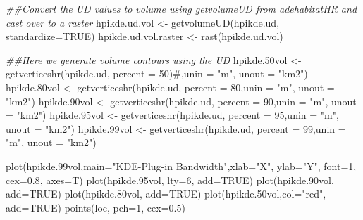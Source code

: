 \documentclass[
  letterpaper,
]{book}
\newenvironment{Shaded}{\begin{snugshade}}{\end{snugshade}}
\newcommand{\AttributeTok}[1]{\textcolor[rgb]{0.40,0.45,0.13}{#1}}
\newcommand{\CommentTok}[1]{\textcolor[rgb]{0.37,0.37,0.37}{#1}}
\newcommand{\ConstantTok}[1]{\textcolor[rgb]{0.56,0.35,0.01}{#1}}
\newcommand{\DecValTok}[1]{\textcolor[rgb]{0.68,0.00,0.00}{#1}}
\newcommand{\DocumentationTok}[1]{\textcolor[rgb]{0.37,0.37,0.37}{\textit{#1}}}
\newcommand{\FloatTok}[1]{\textcolor[rgb]{0.68,0.00,0.00}{#1}}
\newcommand{\FunctionTok}[1]{\textcolor[rgb]{0.28,0.35,0.67}{#1}}
\newcommand{\NormalTok}[1]{\textcolor[rgb]{0.00,0.23,0.31}{#1}}
\newcommand{\OtherTok}[1]{\textcolor[rgb]{0.00,0.23,0.31}{#1}}
\newcommand{\StringTok}[1]{\textcolor[rgb]{0.13,0.47,0.30}{#1}}
\begin{document}
\begin{Shaded}
\begin{Highlighting}[]
\DocumentationTok{\#\#Convert the UD values to volume using getvolumeUD from adehabitatHR and cast over to a raster}
\NormalTok{hpikde.ud.vol }\OtherTok{\textless{}{-}} \FunctionTok{getvolumeUD}\NormalTok{(hpikde.ud, }\AttributeTok{standardize=}\ConstantTok{TRUE}\NormalTok{)}
\NormalTok{hpikde.ud.vol.raster }\OtherTok{\textless{}{-}} \FunctionTok{rast}\NormalTok{(hpikde.ud.vol)}

\DocumentationTok{\#\#Here we generate volume contours using the UD}
\NormalTok{hpikde}\FloatTok{.50}\NormalTok{vol }\OtherTok{\textless{}{-}} \FunctionTok{getverticeshr}\NormalTok{(hpikde.ud, }\AttributeTok{percent =} \DecValTok{50}\NormalTok{)}\CommentTok{\#,unin = "m", unout = "km2")}
\NormalTok{hpikde}\FloatTok{.80}\NormalTok{vol }\OtherTok{\textless{}{-}} \FunctionTok{getverticeshr}\NormalTok{(hpikde.ud, }\AttributeTok{percent =} \DecValTok{80}\NormalTok{,}\AttributeTok{unin =} \StringTok{"m"}\NormalTok{, }\AttributeTok{unout =} \StringTok{"km2"}\NormalTok{)}
\NormalTok{hpikde}\FloatTok{.90}\NormalTok{vol }\OtherTok{\textless{}{-}} \FunctionTok{getverticeshr}\NormalTok{(hpikde.ud, }\AttributeTok{percent =} \DecValTok{90}\NormalTok{,}\AttributeTok{unin =} \StringTok{"m"}\NormalTok{, }\AttributeTok{unout =} \StringTok{"km2"}\NormalTok{)}
\NormalTok{hpikde}\FloatTok{.95}\NormalTok{vol }\OtherTok{\textless{}{-}} \FunctionTok{getverticeshr}\NormalTok{(hpikde.ud, }\AttributeTok{percent =} \DecValTok{95}\NormalTok{,}\AttributeTok{unin =} \StringTok{"m"}\NormalTok{, }\AttributeTok{unout =} \StringTok{"km2"}\NormalTok{)}
\NormalTok{hpikde}\FloatTok{.99}\NormalTok{vol }\OtherTok{\textless{}{-}} \FunctionTok{getverticeshr}\NormalTok{(hpikde.ud, }\AttributeTok{percent =} \DecValTok{99}\NormalTok{,}\AttributeTok{unin =} \StringTok{"m"}\NormalTok{, }\AttributeTok{unout =} \StringTok{"km2"}\NormalTok{)}

\FunctionTok{plot}\NormalTok{(hpikde}\FloatTok{.99}\NormalTok{vol,}\AttributeTok{main=}\StringTok{"KDE{-}Plug{-}in Bandwidth"}\NormalTok{,}\AttributeTok{xlab=}\StringTok{"X"}\NormalTok{, }\AttributeTok{ylab=}\StringTok{"Y"}\NormalTok{, }\AttributeTok{font=}\DecValTok{1}\NormalTok{, }\AttributeTok{cex=}\FloatTok{0.8}\NormalTok{, }\AttributeTok{axes=}\NormalTok{T)}
\FunctionTok{plot}\NormalTok{(hpikde}\FloatTok{.95}\NormalTok{vol, }\AttributeTok{lty=}\DecValTok{6}\NormalTok{, }\AttributeTok{add=}\ConstantTok{TRUE}\NormalTok{)}
\FunctionTok{plot}\NormalTok{(hpikde}\FloatTok{.90}\NormalTok{vol, }\AttributeTok{add=}\ConstantTok{TRUE}\NormalTok{)}
\FunctionTok{plot}\NormalTok{(hpikde}\FloatTok{.80}\NormalTok{vol, }\AttributeTok{add=}\ConstantTok{TRUE}\NormalTok{)}
\FunctionTok{plot}\NormalTok{(hpikde}\FloatTok{.50}\NormalTok{vol,}\AttributeTok{col=}\StringTok{"red"}\NormalTok{, }\AttributeTok{add=}\ConstantTok{TRUE}\NormalTok{)}
\FunctionTok{points}\NormalTok{(loc, }\AttributeTok{pch=}\DecValTok{1}\NormalTok{, }\AttributeTok{cex=}\FloatTok{0.5}\NormalTok{)}
\end{Highlighting}
\end{Shaded}
\end{document}

